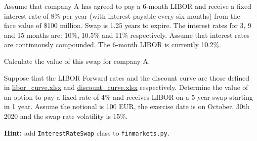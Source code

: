 \begin{question}
Assume that company A has agreed to pay a 6-month LIBOR and receive a fixed interest rate of 8\% per year (with interest payable every six months) from the face value of \$100 million. Swap is 1.25 years to expire. The interest rates for 3, 9 and 15 months are: 10\%, 10.5\% and 11\% respectively. Assume that interest rates are continuously compounded. The 6-month LIBOR is currently 10.2\%. 

Calculate the value of this swap for company A.
\end{question}


%
%	
%	

\begin{question}
Suppose that the LIBOR Forward rates and the discount curve are those defined in
\href{https://github.com/matteosan1/finance_course/raw/develop/libro/input_files/libor_curve.xlsx}{libor\_curve.xlsx} and \href{https://github.com/matteosan1/finance_course/raw/develop/libro/input_files/discount_curve.xlsx}{discount\_curve.xlsx} respectively.
Determine the value of an option to pay a fixed rate of 4\% and receives LIBOR on a 5 year swap starting in 1 year. Assume the notional is 100 EUR, the exercise date is on October, 30th 2020 and the swap rate volatility is 15\%.

\noindent\textbf{Hint:} add \texttt{InterestRateSwap} class to \texttt{finmarkets.py}.
\end{question}

